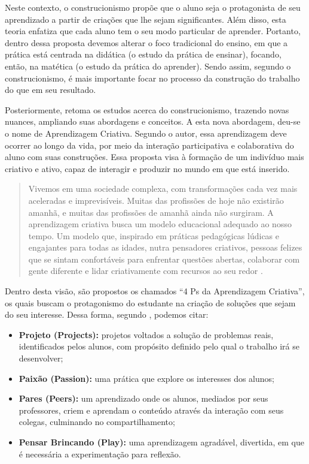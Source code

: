 \documentclass[portuguese]{textolivre}
\begin{document}
Neste contexto, o construcionismo propõe que o aluno seja o protagonista de seu aprendizado a partir de criações que lhe sejam significantes. Além disso, esta teoria enfatiza que cada aluno tem o seu modo particular de aprender. Portanto, dentro dessa proposta devemos alterar o foco tradicional do ensino, em que a prática está centrada na didática (o estudo da prática de ensinar), focando, então, na matética (o estudo da prática do aprender). Sendo assim, segundo o construcionismo, é mais importante focar no processo da construção do trabalho do que em seu resultado.

Posteriormente, \textcite{resnick} retoma os estudos acerca do construcionismo, trazendo novas nuances, ampliando suas abordagens e conceitos. A esta nova abordagem, deu-se o nome de Aprendizagem Criativa. Segundo o autor, essa aprendizagem deve ocorrer ao longo da vida, por meio da interação participativa e colaborativa do aluno com suas construções. Essa proposta visa à formação de um indivíduo mais criativo e ativo, capaz de interagir e produzir no mundo em que está inserido.

\begin{quote}
    Vivemos em uma sociedade complexa, com transformações cada vez mais aceleradas e imprevisíveis. Muitas das profissões de hoje não existirão amanhã, e muitas das profissões de amanhã ainda não surgiram. A aprendizagem criativa busca um modelo educacional adequado ao nosso tempo. Um modelo que, inspirado em práticas pedagógicas lúdicas e engajantes para todas as idades, nutra pensadores criativos, pessoas felizes que se sintam confortáveis para enfrentar questões abertas, colaborar com gente diferente e lidar criativamente com recursos ao seu redor \cite [p. 16] {burd}.
\end{quote}

Dentro desta visão, são propostos os chamados “4 Ps da Aprendizagem Criativa”, os quais buscam o protagonismo do estudante na criação de soluções que sejam do seu interesse. Dessa forma, segundo \textcite {resnick}, podemos citar:

\begin{itemize}
\item \textbf{Projeto (Projects):} projetos voltados a solução de problemas reais, identificados pelos alunos, com propósito definido pelo qual o trabalho irá se desenvolver;
\item \textbf{Paixão (Passion):} uma prática que explore os interesses dos alunos;
\item \textbf{Pares (Peers):}  um aprendizado onde os alunos, mediados por seus professores, criem e aprendam o conteúdo através da interação com seus colegas, culminando no compartilhamento; 
\item \textbf{Pensar Brincando (Play):} uma aprendizagem  agradável, divertida, em que é necessária a experimentação para reflexão.
\end{itemize}
\end{document}
